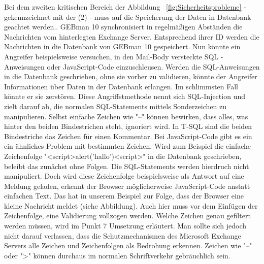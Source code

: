 \noindent
Bei dem zweiten kritischen Bereich der Abbildung ~\ref{fig:Sicherheitsprobleme} - gekennzeichnet mit der (2) - muss auf die Speicherung der Daten in Datenbank geachtet werden.. GEBman 10 synchronisiert in regelmäßigen Abständen die Nachrichten vom hinterlegten Exchange Server. Entsprechend ihrer ID werden die Nachrichten in die Datenbank von GEBman 10 gespeichert. Nun könnte ein Angreifer beispielsweise versuchen, in den Mail-Body versteckte SQL -Anweisungen oder JavaScript-Code einzuschleusen. Werden die SQL-Anweisungen in die Datenbank geschrieben, ohne sie vorher zu validieren, könnte der Angreifer Informationen über Daten in der Datenbank erlangen. Im schlimmsten Fall könnte er sie zerstören. Diese Angriffstmethode nennt sich SQL-Injection und zielt darauf ab, die normalen SQL-Statements mittels Sonderzeichen zu manipulieren. Selbst einfache Zeichen wie "--" können bewirken, dass alles, was hinter den beiden Bindestrichen steht, ignoriert wird. In T-SQL sind die beiden Bindestriche das Zeichen für einen Kommentar.
\noindent
Bei JavaScript-Code gibt es ein ein ähnliches Problem mit bestimmten Zeichen. Wird zum Beispiel die einfache Zeichenfolge "<script>alert('hallo')<script>" in die Datenbank geschrieben, beleibt das zunächst ohne Folgen. Die SQL-Statements werden hierdruch nicht manipuliert. Doch wird diese Zeichenfolge beispielsweise als Antwort auf eine Meldung geladen, erkennt der Browser möglicherweise JavaScript-Code anstatt einfachen Text. Das hat in unserem Beispiel zur Folge, dass der Browser eine kleine Nachricht meldet (siehe Abbildung).
Auch hier muss vor dem Einfügen der Zeichenfolge, eine Validierung vollzogen werden. Welche Zeichen genau gefiltert werden müssen, wird im Punkt 7 Umsetzung erläutert. Man sollte sich jedoch nicht darauf verlassen, dass die Schutzmechanismen des Microsoft Exchange Servers alle Zeichen und Zeichenfolgen als Bedrohung erkennen. Zeichen wie "--" oder ">" können durchaus im normalen Schriftverkehr gebräuchlich sein.
\noindent
 

